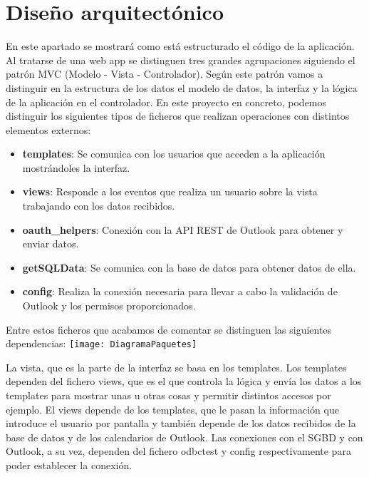 \section{Diseño arquitectónico}
En este apartado se mostrará como está estructurado el código de la aplicación. Al tratarse de una web app se distinguen tres grandes agrupaciones siguiendo el patrón MVC (Modelo - Vista - Controlador). Según este patrón vamos a distinguir en la estructura de los datos el modelo de datos, la interfaz y la lógica de la aplicación en el controlador.\newline
En este proyecto en concreto, podemos distinguir los siguientes tipos de ficheros que realizan operaciones con distintos elementos externos:
\begin{itemize}
    \item \textbf{templates}: Se comunica con los usuarios que acceden a la aplicación mostrándoles la interfaz.
    \item \textbf{views}: Responde a los eventos que realiza un usuario sobre la vista trabajando con los datos recibidos.
    \item \textbf{oauth\_helpers}: Conexión con la API REST de Outlook para obtener y enviar datos.
    \item \textbf{getSQLData}: Se comunica con la base de datos para obtener datos de ella.
    \item \textbf{config}: Realiza la conexión necesaria para llevar a cabo la validación de Outlook y los permisos proporcionados.
\end{itemize}
Entre estos ficheros que acabamos de comentar se distinguen las siguientes dependencias:\newline
\texttt{[image: DiagramaPaquetes]}\newline

La vista, que es la parte de la interfaz se basa en los templates.\newline
Los templates dependen del fichero views, que es el que controla la lógica y envía los datos a los templates para mostrar unas u otras cosas y permitir distintos accesos por ejemplo.\newline
El views depende de los templates, que le pasan la información que introduce el usuario por pantalla y también depende de los datos recibidos de la base de datos y de los calendarios de Outlook.\newline
Las conexiones con el SGBD y con Outlook, a su vez, dependen del fichero odbctest y config respectivamente para poder establecer la conexión.
